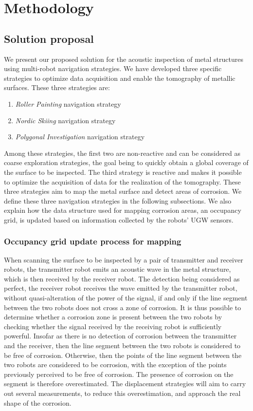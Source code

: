 
\chapter{Methodology}

\section*{Solution proposal}

We present our proposed solution for the acoustic inspection of metal structures using multi-robot navigation strategies.
We have developed three specific strategies to optimize data acquisition and enable the tomography of metallic surfaces.
These three strategies are:
\begin{enumerate}
	\item \textit{Roller Painting} navigation strategy
	\item \textit{Nordic Skiing} navigation strategy
	\item \textit{Polygonal Investigation} navigation strategy
\end{enumerate}
Among these strategies, the first two are non-reactive and can be considered as coarse exploration strategies, the goal being to quickly obtain a global coverage of the surface to be inspected.
The third strategy is reactive and makes it possible to optimize the acquisition of data for the realization of the tomography.
These three strategies aim to map the metal surface and detect areas of corrosion.
We define these three navigation strategies in the following subsections.
We also explain how the data structure used for mapping corrosion areas, an occupancy grid, is updated based on information collected by the robots' UGW sensors.

\subsection*{Occupancy grid update process for mapping}

When scanning the surface to be inspected by a pair of transmitter and receiver robots, the transmitter robot emits an acoustic wave in the metal structure, which is then received by the receiver robot.
The detection being considered as perfect, the receiver robot receives the wave emitted by the transmitter robot, without quasi-alteration of the power of the signal, if and only if the line segment between the two robots does not cross a zone of corrosion.
It is thus possible to determine whether a corrosion zone is present between the two robots by checking whether the signal received by the receiving robot is sufficiently powerful.
Insofar as there is no detection of corrosion between the transmitter and the receiver, then the line segment between the two robots is considered to be free of corrosion.
Otherwise, then the points of the line segment between the two robots are considered to be corrosion, with the exception of the points previously perceived to be free of corrosion.
The presence of corrosion on the segment is therefore overestimated.
The displacement strategies will aim to carry out several measurements, to reduce this overestimation, and approach the real shape of the corrosion.

